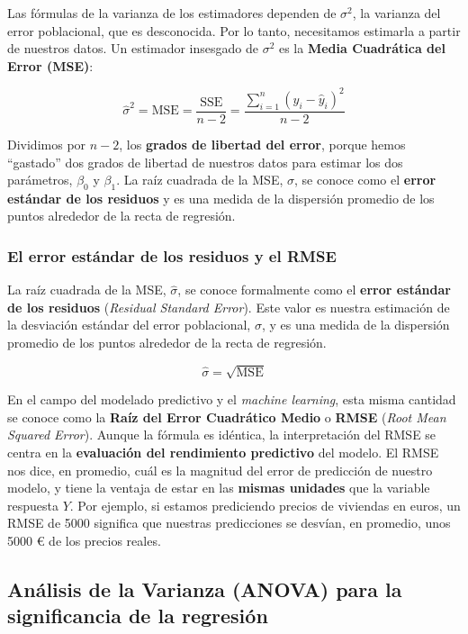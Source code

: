 \documentclass[
  letterpaper,
  DIV=11,
  numbers=noendperiod]{scrreprt}
\begin{document}
Las fórmulas de la varianza de los estimadores dependen de \(\sigma^2\),
la varianza del error poblacional, que es desconocida. Por lo tanto,
necesitamos estimarla a partir de nuestros datos. Un estimador insesgado
de \(\sigma^2\) es la \textbf{Media Cuadrática del Error (MSE)}:

\[
\hat{\sigma}^2 = \text{MSE} = \frac{\text{SSE}}{n-2} = \frac{\sum_{i=1}^{n}(y_i - \hat{y}_i)^2}{n-2}
\]

Dividimos por \(n-2\), los \textbf{grados de libertad del error}, porque
hemos ``gastado'' dos grados de libertad de nuestros datos para estimar
los dos parámetros, \(\beta_0\) y \(\beta_1\). La raíz cuadrada de la
MSE, \(\hat{\sigma}\), se conoce como el \textbf{error estándar de los
residuos} y es una medida de la dispersión promedio de los puntos
alrededor de la recta de regresión.

\subsubsection{El error estándar de los residuos y el
RMSE}\label{el-error-estuxe1ndar-de-los-residuos-y-el-rmse}

La raíz cuadrada de la MSE, \(\hat{\sigma}\), se conoce formalmente como
el \textbf{error estándar de los residuos} (\emph{Residual Standard
Error}). Este valor es nuestra estimación de la desviación estándar del
error poblacional, \(\sigma\), y es una medida de la dispersión promedio
de los puntos alrededor de la recta de regresión.

\[
\hat{\sigma} = \sqrt{\text{MSE}}
\]

En el campo del modelado predictivo y el \emph{machine learning}, esta
misma cantidad se conoce como la \textbf{Raíz del Error Cuadrático
Medio} o \textbf{RMSE} (\emph{Root Mean Squared Error}). Aunque la
fórmula es idéntica, la interpretación del RMSE se centra en la
\textbf{evaluación del rendimiento predictivo} del modelo. El RMSE nos
dice, en promedio, cuál es la magnitud del error de predicción de
nuestro modelo, y tiene la ventaja de estar en las \textbf{mismas
unidades} que la variable respuesta \(Y\). Por ejemplo, si estamos
prediciendo precios de viviendas en euros, un RMSE de 5000 significa que
nuestras predicciones se desvían, en promedio, unos 5000 € de los
precios reales.

\subsection{Análisis de la Varianza (ANOVA) para la significancia de la
regresión}\label{anuxe1lisis-de-la-varianza-anova-para-la-significancia-de-la-regresiuxf3n}
\end{document}
